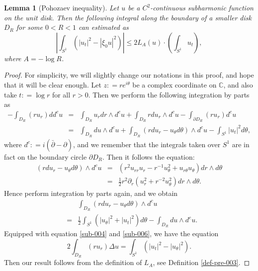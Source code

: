\documentclass[a4paper,11pt]{amsart}
\numberwithin{equation}{section}
\newtheorem{lemma}[theorem]{Lemma}
\def\dbar{\bar\partial}
\def\d{\partial}
\def\bC{{\mathbb C}}
\begin{document}
\begin{lemma}[Pohozaev inequality]
\label{lem-sub-002}
Let $u$ be a $C^2$-continuous subharmonic function on the unit disk.
Then the following integral along the boundary of a smaller disk $D_R$ for some $0< R <1$
can estimated as 
\begin{equation}
\label{sub-007}
\left| \int_{S^1} \left( |u_t|^2 - |\xi_0 u|^2 \right)  \right| \leq 2 L_A(u) \cdot \left( \int_{S^1} u_t \right), 
\end{equation}
where $A = -\log R$. 
\end{lemma}
\begin{proof}
For simplicity, we will slightly change our notations in this proof,  
and hope that it will be clear enough.
Let $z: = r e^{i\theta}$ be a complex coordinate on $\bC$, 
and also take $t: = \log r$ for all $r>0$. 
Then we perform the following integration by parts as 
\begin{eqnarray}
\label{sub-004}
 - \int_{D_R} ( ru_r ) dd^c u 
&=&  \int_{D_R} u_r dr\wedge d^c u + \int_{D_R} r d u_r \wedge d^c u -  \int_{\d D_R} (ru_r) d^c u 
\nonumber\\
&=&  \int_{D_R} du \wedge d^c u + \int_{D_R}  ( r d u_r - u_{\theta} d\theta ) \wedge d^c u 
- \int_{S^1} |u_t|^2 d\theta, 
\end{eqnarray}
where $d^c : = i (\dbar - \d)$, 
and we remember that the integrals taken over $S^1$ are in fact on the boundary circle $\d D_R$. 
Then it follows the equation:
\begin{eqnarray}
\label{sub-005}
 ( r d u_r - u_{\theta} d\theta ) \wedge d^c u 
&=&  \left( r^2 u_{rr} u_r - r^{-1} u^2_{\theta} + u_{r\theta} u_{\theta} \right) dr\wedge d\theta
\nonumber\\
&=& \frac{1}{2}   r^2 \d_r (u_r^2 + r^{-2} u^2_{\theta})  dr \wedge d\theta.
\end{eqnarray}
Hence perform integration by parts again, and we obtain 
\begin{eqnarray}
\label{sub-006}
&&  \int_{D_R} ( r d u_r - u_{\theta} d\theta ) \wedge d^c u 
\nonumber\\
&=&  \frac{1}{2} \int_{S^1} \left( |u_{\theta}|^2 + |u_t|^2  \right) d\theta - \int_{D_R} du \wedge d^c u. 
\end{eqnarray}
Equipped with equation \eqref{sub-004} and \eqref{sub-006}, 
we have the equation 
\begin{equation}
\label{sub-0071}
2\int_{D_R} ( ru_r ) \Delta u
 = \int_{S^1} \left( |u_t|^2 - |u_{\theta}|^2 \right).
\end{equation}
Then our result follows from the definition of $L_A$, see Definition \ref{def-pre-003}. 
\end{proof}
\end{document}
